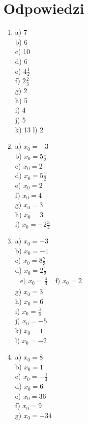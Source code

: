 \documentclass[10pt]{article}
\begin{document}
\section*{Odpowiedzi}
\begin{enumerate}
  \item a) 7\\
b) 6\\
c) 10\\
d) 6\\
e) \(4 \frac{1}{2}\)\\
f) \(2 \frac{2}{3}\)\\
g) 2\\
h) 5\\
i) 4\\
j) 5\\
k) 13 l) 2
  \item a) \(x_{0}=-3\)\\
b) \(x_{0}=5 \frac{1}{2}\)\\
c) \(x_{0}=2\)\\
d) \(x_{0}=5 \frac{1}{2}\)\\
e) \(x_{0}=2\)\\
f) \(x_{0}=4\)\\
g) \(x_{0}=3\)\\
h) \(x_{0}=3\)\\
i) \(x_{0}=-2 \frac{3}{4}\)
  \item a) \(x_{0}=-3\)\\
b) \(x_{0}=-1\)\\
c) \(x_{0}=8 \frac{2}{3}\)\\
d) \(x_{0}=2 \frac{1}{2}\)\\
\(\begin{array}{ll}\text { e) } x_{0}=\frac{4}{3} & \text { f) } x_{0}=2\end{array}\)\\
g) \(x_{0}=3\)\\
h) \(x_{0}=6\)\\
i) \(x_{0}=\frac{3}{8}\)\\
j) \(x_{0}=-5\)\\
k) \(x_{0}=1\)\\
l) \(x_{0}=-2\)
  \item a) \(x_{0}=8\)\\
b) \(x_{0}=1\)\\
c) \(x_{0}=-\frac{1}{4}\)\\
d) \(x_{0}=6\)\\
e) \(x_{0}=36\)\\
f) \(x_{0}=9\)\\
g) \(x_{0}=-34\)\\

\end{enumerate}
\end{document}
